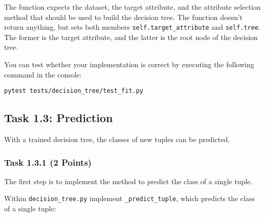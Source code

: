 \documentclass[
english,
smallborders
]{i6prcsht}
\newcommand{\points}[1]{\hfill \color{red}(#1 Points)\color{black}}
\begin{document}
\vspace*{0.5cm}

The function expects the dataset, the target attribute, and the attribute selection method that should be used to build the decision tree. The function doesn't return anything, but sets both members \texttt{self.target\_attribute} and \texttt{self.tree}. The former is the target attribute, and the latter is the root node of the decision tree.

You can test whether your implementation is correct by executing the following command in the console:

\vspace*{0.3cm}

\begin{lstlisting}
pytest tests/decision_tree/test_fit.py
\end{lstlisting}

\newpage

\subsection*{Task 1.3: Prediction}

With a trained decision tree, the classes of new tuples can be predicted.

\subsubsection*{Task 1.3.1 \points{2}}

The first step is to implement the method to predict the class of a single tuple.

Within \texttt{decision\_tree.py} implement \texttt{\_predict\_tuple}, which predicts the class of a single tuple:

\vspace*{0.3cm}
\end{document}
